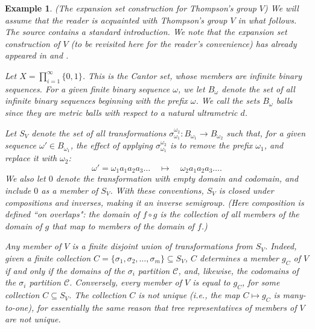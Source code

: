 \documentclass{amsart}
\newtheorem{Example}[theorem]{Example}
\newtheorem{standing assumption}[theorem]{Standing Assumption}
\newenvironment{example}{\begin{Example}\normalfont}{\end{Example}}
\begin{document}
\begin{example} (The expansion set construction for Thompson's group $V$)
\label{example:Vpt1} 
 We will assume that the reader is acquainted with Thompson's group $V$ in what follows. 
The source \cite{CFP} contains a standard introduction. We note that the expansion set construction of $V$ (to be revisited here for the reader's convenience)
has already appeared in \cite{Farley} and \cite{FH2}.

Let $X = \prod_{i=1}^{\infty} \{ 0, 1 \}$. This is the Cantor set, whose members are infinite binary sequences. For a given finite binary sequence $\omega$, we let $B_{\omega}$ denote the
set of all infinite binary sequences beginning with the prefix $\omega$. We call the sets $B_{\omega}$ \emph{balls} since they are metric balls with respect to a natural ultrametric $d$.

Let $S_{V}$ denote the set of all transformations $\sigma_{\omega_{1}}^{\omega_{2}}: B_{\omega_{1}} \rightarrow B_{\omega_{2}}$
such that, for a given sequence $\omega' \in B_{\omega_{1}}$, the effect of applying 
$\sigma_{\omega_{1}}^{\omega_{2}}$ is to remove the prefix $\omega_{1}$, and replace it with 
$\omega_{2}$:
\[ \omega' = \omega_{1}a_{1}a_{2}a_{3} \ldots  \quad \mapsto \quad \omega_{2}a_{1}a_{2}a_{3}\ldots. \]
We also let $0$ denote the transformation with empty domain and codomain, and include $0$ as a member of $S_{V}$. With these conventions, $S_{V}$ is closed under compositions and inverses, making it an inverse semigroup. (Here composition is defined ``on overlaps": the domain of $f \circ g$ is the collection 
of all members of the domain of $g$ that map to members of the domain of $f$.)

Any member of $V$ is a finite disjoint union of transformations from $S_{V}$. Indeed, given 
a finite collection $C = \{ \sigma_{1}, \sigma_{2}, \ldots, \sigma_{m} \}  \subseteq S_{V}$, $C$ determines a member $g_{C}$ of $V$ if and only if the domains of the $\sigma_{i}$ partition $\mathcal{C}$, and, likewise, the codomains of the $\sigma_{i}$ partition $\mathcal{C}$. Conversely, 
every member of $V$ is equal to $g_{C}$, for some collection $C \subseteq S_{V}$. The collection $C$ is not unique (i.e., the map $C \mapsto g_{C}$ is many-to-one), for essentially the same reason that tree representatives of members  of $V$ are not unique.  


\end{example}
\end{document}
